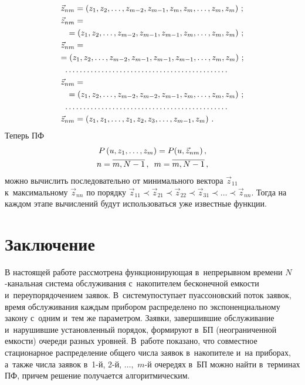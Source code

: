 \begin{multicols}{2}
\noindent
\begin{align*}
{\vec z}_{nm}&=\left(z_1,z_2,\dots,z_{m-2}, z_{m-1}, z_m, z_m, \dots, z_m, z_m\right)\,;
\\
{\vec z}_{nm}&=\\
&\hspace*{-3.5mm}{}=\left(z_1,z_2,\dots,z_{m-2}, z_{m-1}, z_{m-1}, z_m, \dots, z_m, z_m\right)\,;
\\
{\vec z}_{nm}&=\\
&\hspace*{-7mm}{}=\left(z_1,z_2,\dots,z_{m-2}, z_{m-1}, z_{m-1}, z_{m-1}, \dots, z_m, z_m\right)\,;
\\
\dots&  \dots \dots\dots\dots\dots\dots\dots\dots\dots\dots\dots\dots\dots\dots
\\
{\vec z}_{nm}&=\\
&\hspace*{-3.5mm}{}=\left(z_1,z_2,\dots,z_{m-2}, z_{m-2}, z_{m-1}, z_m, \dots, z_m, z_m\right)\,;
\\
\dots&  \dots \dots\dots\dots\dots\dots\dots\dots\dots\dots\dots\dots\dots\dots
\\
{\vec z}_{nm}&=\left(z_1,z_1,\dots,z_{1}, z_{2}, z_3, \dots, z_{m-1}, z_m\right)\,.
\end{align*}
Теперь ПФ 
\begin{multline*}
P\left(u,z_1,\ldots,z_{m}\right)\hm=P(u,{\vec z}_{nm})\,,\\
n=\overline{m,N-1}\,, 
\enskip
m=\overline{m,N-1}\,,
\end{multline*}
можно вычислить последовательно от минимального вектора ${\vec z}_{11}$ к~максимальному
${\vec z}_{nn}$ по порядку ${\vec z}_{11} \prec {\vec z}_{21} \prec {\vec z}_{22} 
\prec {\vec z}_{31} \prec \dots \prec {\vec z}_{nn}$. Тогда на каж\-дом этапе вычислений 
будут использоваться уже известные функции.

\section{Заключение}

В настоящей работе рассмотрена функционирующая в~непрерывном времени $N$-ка\-наль\-ная 
сис\-те\-ма обслуживания с~накопителем бесконечной емкости и~переупорядочением заявок.
В~систему\linebreak поступа\-ет пуассоновский поток заявок, время
обслуживания каждым прибором распределено по экспоненциальному закону с~одним и~тем же параметром.
Заявки, завершившие обслуживание и~нарушившие
установленный порядок, формируют в~БП
(неограниченной емкости) очереди разных уровней.
В~работе показано, что совместное стационарное распределение
общего числа заявок в~накопителе и~на приборах, а~также числа заявок
в~1-й, 2-й, $\ldots,$ $m$-й очередях в~БП
можно найти в~терминах ПФ, причем
решение получается алгоритмическим.


\end{multicols}
